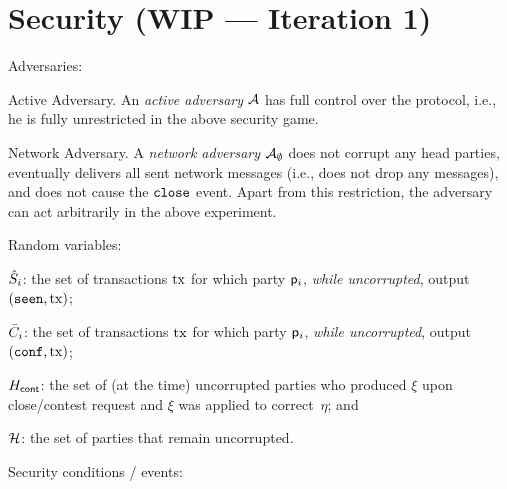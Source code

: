\section{Security (WIP --- Iteration 1)}\label{sec:security}

Adversaries:

\begin{mdescription}
\item[Active Adversary.] An \emph{active adversary} $\mathcal{A}$ has full control
  over the protocol, i.e., he is fully unrestricted in the above security game.

 \item[Network Adversary.] A \emph{network adversary} $\mathcal{A}_\emptyset$ does not corrupt
   any head parties, eventually delivers all sent network messages
   (i.e., does not drop any messages), and does not cause the $\mathtt{close}$ event.
   Apart from this restriction, the adversary can act arbitrarily in the above experiment.
\end{mdescription}

\noindent Random variables:

\begin{mitemize}
  \item $\hat{S}_i$: the set of transactions $\mathrm{tx}$ for which party
  $\mathsf p_i$, \emph{while uncorrupted}, output $(\mathtt{seen},\mathrm{tx})$;
  \item $\bar{C}_i$: the set of transactions $\mathrm{tx}$ for which party
  $\mathsf p_i$, \emph{while uncorrupted}, output $(\mathtt{conf},\mathrm{tx})$;
  \item $H_{\mathsf{cont}}$: the set of (at the time) uncorrupted parties who
  produced $\xi$ upon close/contest request and $\xi$ was applied to
  correct~$\eta$; and
  \item $\mathcal H$: the set of parties that remain uncorrupted.
\end{mitemize}


\noindent Security conditions / events:

